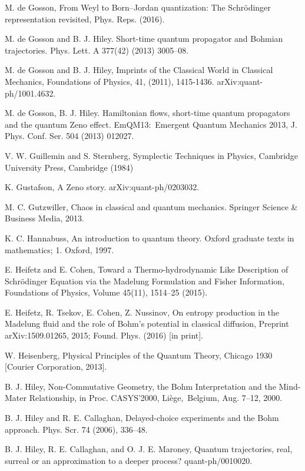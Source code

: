 \documentclass[12pt]{article}%
\begin{document}
\begin{thebibliography}{99}
M. de Gosson, From Weyl to Born--Jordan quantization: The
Schr\"{o}dinger representation revisited, Phys. Reps. (2016).

M. de Gosson and B. J. Hiley. Short-time quantum propagator
and Bohmian trajectories. Phys. Lett. A 377(42) (2013) 3005--08.

M. de Gosson and B. J. Hiley, Imprints of the Classical
World in Classical Mechanics, Foundations of Physics, 41, (2011), 1415-1436. arXiv:quant-ph/1001.4632.

M. de Gosson, B. J. Hiley. Hamiltonian flows, short-time
quantum propagators and the quantum Zeno effect. EmQM13:\ Emergent Quantum
Mechanics 2013, J. Phys. Conf. Ser. 504 (2013) 012027.

V. W. Guillemin and S. Sternberg, Symplectic Techniques in
Physics, Cambridge University Press, Cambridge (1984)

K. Gustafson, A Zeno story. arXiv:quant-ph/0203032.

M. C. Gutzwiller, Chaos in classical and quantum mechanics.
Springer Science \& Business Media, 2013.

K. C. Hannabuss, An introduction to quantum theory. Oxford
graduate texts in mathematics; 1. Oxford, 1997.

E. Heifetz and E. Cohen, Toward a Thermo-hydrodynamic Like
Description of Schr\"{o}dinger Equation via the Madelung Formulation and
Fisher Information, Foundations of Physics, Volume 45(11), 1514--25 (2015).

E. Heifetz, R. Tsekov, E. Cohen, Z. Nussinov, On entropy
production in the Madelung fluid and the role of Bohm's potential in classical
diffusion, Preprint arXiv:1509.01265, 2015; Found. Phys. (2016) [in print].

W. Heisenberg, Physical Principles of the Quantum Theory,
Chicago 1930 [Courier Corporation, 2013].

B. J. Hiley, Non-Commutative Geometry, the Bohm
Interpretation and the Mind-Mater Relationship, in Proc. CASYS'2000,
Li\`{e}ge,\ Belgium, Aug. 7--12, 2000.

B. J. Hiley and R. E. Callaghan, Delayed-choice experiments and
the Bohm approach. Phys. Scr. 74 (2006), 336--48.

B. J. Hiley, R. E. Callaghan, and O. J. E. Maroney, Quantum
trajectories, real, surreal or an approximation to a deeper process? quant-ph/0010020.


\end{thebibliography}
\end{document}
